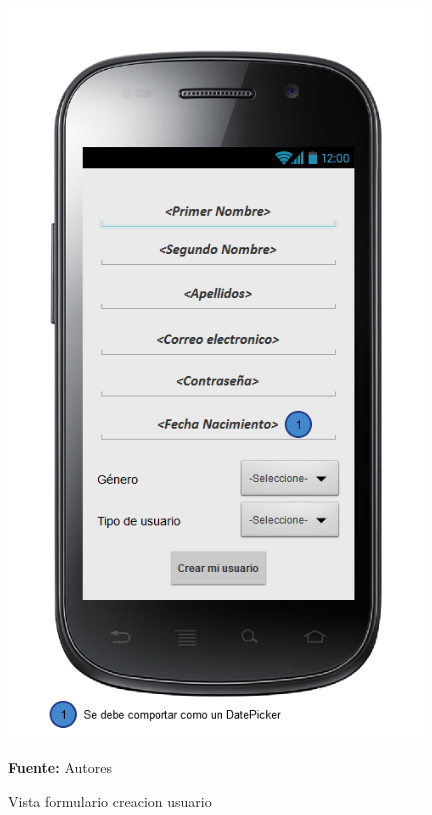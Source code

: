 \begin{figure}[!htb]
  \begin{center}
\includegraphics[width=11cm]{./imagenes/UI/Usuarios/formulario_creacion_usuario.png}
    \caption{Vista formulario creacion usuario}
    \label{fig:Vista_formulario_creacion_usuario}
    \textbf{Fuente:}  Autores
  \end{center}
\end{figure}
